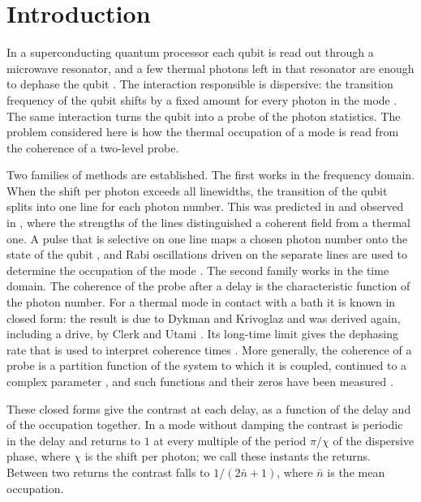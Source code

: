 \documentclass[11pt,reqno]{amsart}
\makeatletter
\let\CG@origcite\cite
\renewcommand*{\cite}[2][]{\def\CG@citekey{#2}%
  \ifx\relax#1\relax\CG@origcite{#2}\else\CG@origcite[#1]{#2}\fi}
\numberwithin{equation}{section}
\theoremstyle{plain}
\theoremstyle{definition}
\theoremstyle{remark}
\makeatother
\begin{document}
\section{Introduction}\label{sec:intro}

In a superconducting quantum processor each qubit is read out through a microwave resonator, and a few thermal photons left in that resonator are enough to dephase the qubit \cite{Rigetti2012,Sears2012}. The interaction responsible is dispersive: the transition frequency of the qubit shifts by a fixed amount for every photon in the mode \cite{Blais2021}. The same interaction turns the qubit into a probe of the photon statistics. The problem considered here is how the thermal occupation of a mode is read from the coherence of a two-level probe.

Two families of methods are established. The first works in the frequency domain. When the shift per photon exceeds all linewidths, the transition of the qubit splits into one line for each photon number. This was predicted in \cite{Gambetta2006} and observed in \cite{Schuster2007}, where the strengths of the lines distinguished a coherent field from a thermal one. A pulse that is selective on one line maps a chosen photon number onto the state of the qubit \cite{Johnson2010}, and Rabi oscillations driven on the separate lines are used to determine the occupation of the mode \cite{Sears2012}. The second family works in the time domain. The coherence of the probe after a delay is the characteristic function of the photon number. For a thermal mode in contact with a bath it is known in closed form: the result is due to Dykman and Krivoglaz \cite{DykmanKrivoglaz1987} and was derived again, including a drive, by Clerk and Utami \cite{ClerkUtami2007}. Its long-time limit gives the dephasing rate that is used to interpret coherence times \cite{Rigetti2012}. More generally, the coherence of a probe is a partition function of the system to which it is coupled, continued to a complex parameter \cite{WeiLiu2012}, and such functions and their zeros have been measured \cite{Peng2015}.

These closed forms give the contrast at each delay, as a function of the delay and of the occupation together. In a mode without damping the contrast is periodic in the delay and returns to $1$ at every multiple of the period $\pi/\chi$ of the dispersive phase, where $\chi$ is the shift per photon; we call these instants the returns. Between two returns the contrast falls to $1/(2\bar n+1)$, where $\bar n$ is the mean occupation.
\end{document}
